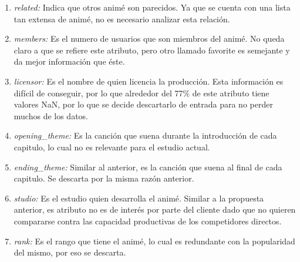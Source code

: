 \documentclass[a4paper]{article}
\begin{document}
\begin{enumerate}
    \item \textit{related:} Indica que otros animé son parecidos. Ya que se cuenta con una lista tan extensa de animé, no es necesario analizar esta relación.
    \item \textit{members:} Es el numero de usuarios que son miembros del animé. No queda claro a que se refiere este atributo, pero otro llamado favorite es semejante y da mejor información que éste.
    \item \textit{licensor:} Es el nombre de quien licencia la producción. Esta información es difícil de conseguir, por lo que alrededor del 77\% de este atributo tiene valores NaN, por lo que se decide descartarlo de entrada para no perder muchos de los datos.
    \item \textit{opening\_theme:} Es la canción que suena durante la introducción de cada capitulo, lo cual no es relevante para el estudio actual.
    \item \textit{ending\_theme:} Similar al anterior, es la canción que suena al final de cada capitulo. Se descarta por la misma razón anterior.
    \item \textit{studio:} Es el estudio quien desarrolla el animé. Similar a la propuesta anterior, es atributo no es de interés por parte del cliente dado que no quieren compararse contra las capacidad productivas de los competidores directos.
    \item \textit{rank:} Es el rango que tiene el animé, lo cual es redundante con la popularidad del mismo, por eso se descarta.
\end{enumerate}
\end{document}
